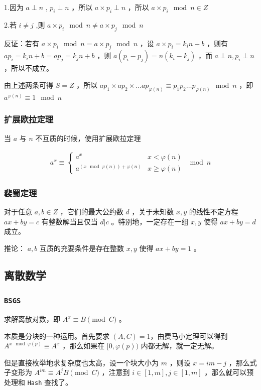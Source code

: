\documentclass[UTF-8]{ctexart}
\begin{document}
	1.因为 $a \perp n$ , $p _ i \perp n$ ，所以 $a \times p _ i \perp n$ ，所以 $a \times p _ i \mod{n} \in Z$
	
	2.若 $i \neq j$ ,则 $a \times p _ i \mod{n} \neq a \times p _ j \mod{n}$ 
	
	反证：若有 $a \times p _ i \mod{n} = a \times p _ j \mod{n}$ ，设 $a \times p _ i=k _ in+b$ ，则有 $a p _ i=k _ in+b=ap _ j=k _ jn+b$ ，则 $a(p _ i-p _ j)=n(k _ i-k _ j)$ ，而 $a \perp n,p _ i \perp n$ ，所以不成立。
	
	由上述两条可得 $S=Z$ ，所以 $ap _ 1 \times ap _ 2 \times \dots ap _ {\varphi(n)} \equiv p _ 1 p _ 2 \dots p _ {\varphi(n)} \mod{n}$ ，即 $a^{\varphi(n)} \equiv 1 \mod{n}$ 
	
	\subsubsection{扩展欧拉定理}
	当 $a$ 与 $n$ 不互质的时候，使用扩展欧拉定理
	
	\begin{align}
	a ^ x \equiv \begin{cases} a ^ x & x < \varphi(n) \nonumber\\ a ^ {(x \mod \varphi(n))+\varphi(n)} & x \ge \varphi(n) \end{cases} \mod n\nonumber
	\end{align}
	\subsubsection{裴蜀定理}
	对于任意 $a,b \in Z$ ，它们的最大公约数 $d$ ，关于未知数 $x,y$ 的线性不定方程 $ax+by=c$ 有整数解当且仅当 $d|c$ 。特别地，一定存在一组 $x,y$ 使得 $ax+by=d$ 成立。
	
	推论： $a,b$ 互质的充要条件是存在整数 $x,y$ 使得 $ax+by=1$ 。
	\subsection{离散数学}
	\subsubsection{\texttt{BSGS}}
	求解离散对数，即 $A^x \equiv B \pmod C$ 。
	
	本质是分块的一种运用。首先要求 $(A,C)=1$，由费马小定理可以得到 $A ^ {x \mod \varphi(p)} \equiv A ^ x$ ，那么如果在 $[0,\varphi(p))$ 内都无解，就一定无解。
	
	但是直接枚举地求复杂度也太高，设一个块大小为 $m$ ，则设 $x=im-j$ ，那么式子变形为 $A^{im} \equiv A^jB \pmod C$ ，注意到 $i \in [1,m],j \in [1,m]$ ，那么就可以预处理和 \texttt{Hash} 查找了。
	
\end{document}
